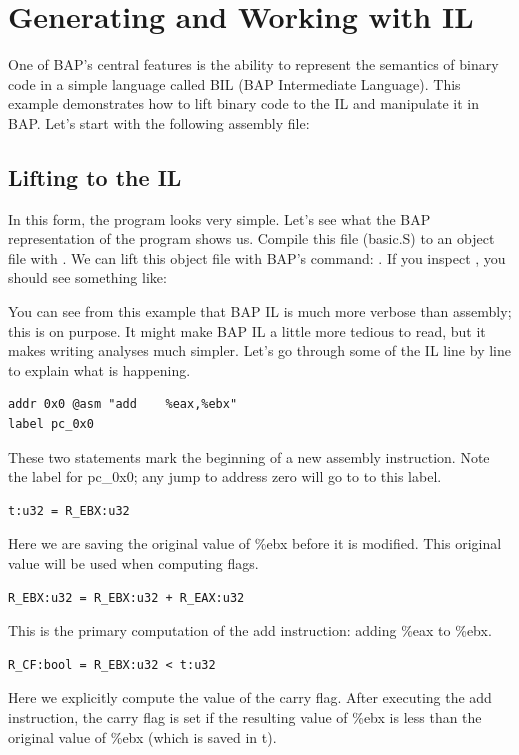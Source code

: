 \section{Generating and Working with IL}

One of BAP's central features is the ability to represent the
semantics of binary code in a simple language called BIL (BAP
Intermediate Language).  This example demonstrates how to lift binary
code to the IL and manipulate it in BAP.  Let's start with the
following assembly file:



\subsection{Lifting to the IL}

In this form, the program looks very simple.  Let's see what the BAP
representation of the program shows us.  Compile this file (basic.S)
to an object file with .  We can
lift this object file with BAP's  command: . If you inspect , you
should see something like:



You can see from this example that BAP IL is much more verbose than
assembly; this is on purpose.  It might make BAP IL a little more
tedious to read, but it makes writing analyses much simpler.  Let's go
through some of the IL line by line to explain what is happening.

\begin{verbatim}
addr 0x0 @asm "add    %eax,%ebx"
label pc_0x0
\end{verbatim}
These two statements mark the beginning of a new assembly instruction.
Note the label for pc\_0x0; any jump to address zero will go to to
this label.

\begin{verbatim}
t:u32 = R_EBX:u32
\end{verbatim}
Here we are saving the original value of \%ebx before it is modified.
This original value will be used when computing flags.

\begin{verbatim}
R_EBX:u32 = R_EBX:u32 + R_EAX:u32
\end{verbatim}
This is the primary computation of the add instruction: adding \%eax
to \%ebx.

\begin{verbatim}
R_CF:bool = R_EBX:u32 < t:u32
\end{verbatim}
Here we explicitly compute the value of the carry flag.  After
executing the add instruction, the carry flag is set if the resulting
value of \%ebx is less than the original value of \%ebx (which is
saved in t).

